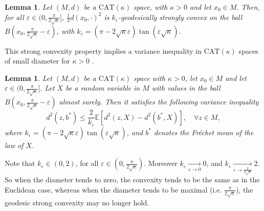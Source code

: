 \documentclass[10pt,a4paper]{article}
\theoremstyle{plain}
\newtheorem{lemma}[theorem]{Lemma}
\theoremstyle{definition}
\theoremstyle{remark}
\newcommand{\E}{\mathbb{E}}
\newcommand{\CAT}{\textrm{CAT}}
\begin{document}
\begin{lemma}
    Let $(M,d)$ be a $\CAT(\kappa)$ space, with $\kappa>0$ and let $x_0\in M$. Then, for all $\varepsilon\in (0,\frac{\pi}{2\sqrt{\kappa}}]$, $\frac{1}{2}d(x_0,\cdot)^2$ is $k_\varepsilon$-geodesically strongly convex on the ball $B\left(x_0,\frac{\pi}{2\sqrt{\kappa}}-\varepsilon\right)$, with $k_\varepsilon=(\pi-2\sqrt{\kappa}\varepsilon)\tan(\varepsilon\sqrt{\kappa})$.
\end{lemma}


This strong convexity property implies a variance inequality in $\CAT(\kappa)$ spaces of small diameter for $\kappa>0$ . %

\begin{lemma}\label{variaceineqcatun}
Let $(M,d)$ be a $\CAT(\kappa)$ space with $\kappa>0$, let $x_0\in M$ and let $\varepsilon\in (0,\frac{\pi}{2\sqrt{\kappa}}]$. Let $X$ be a random variable in $M$ with values in the ball $B\left(x_0,\frac{\pi}{2\sqrt{\kappa}}-\varepsilon\right)$ almost surely. Then it satisfies the following variance inequality 
\begin{equation}
    d^2(z,b^*) \leq \frac{2}{k_\varepsilon}\E \left[d^2(z,X)-d^2(b^*,X)\right], \quad \forall z\in M,  
\end{equation}
where $k_\varepsilon=(\pi-2\sqrt{\kappa}\varepsilon)\tan(\varepsilon\sqrt{\kappa})$, and $b^*$ denotes the Fréchet mean of the law of $X$.
\end{lemma}

Note that $k_\varepsilon\in (0,2)$, for all $\varepsilon\in (0,\frac{\pi}{2\sqrt{\kappa}})$. Moreover $k_\varepsilon\xrightarrow[\varepsilon\to 0]{} 0$, and $k_\varepsilon\xrightarrow[\varepsilon\to \frac{\pi}{2\sqrt{\kappa}}]{} 2$. So when the diameter tends to zero, the convexity tends to be the same as in the Euclidean case, whereas when the diameter tends to be maximal (i.e. $\frac{\pi}{2\sqrt{\kappa}}$), the geodesic strong convexity may no longer hold. 
\end{document}
